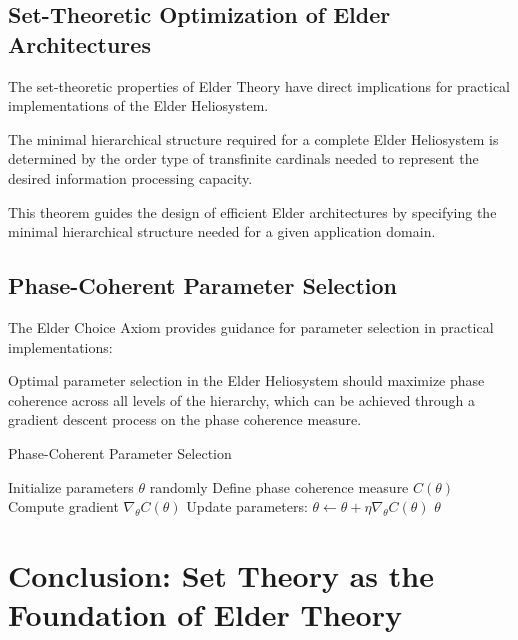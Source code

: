 \subsection{Set-Theoretic Optimization of Elder Architectures}

The set-theoretic properties of Elder Theory have direct implications for practical implementations of the Elder Heliosystem.

\begin{theorem}
The minimal hierarchical structure required for a complete Elder Heliosystem is determined by the order type of transfinite cardinals needed to represent the desired information processing capacity.
\end{theorem}

This theorem guides the design of efficient Elder architectures by specifying the minimal hierarchical structure needed for a given application domain.

\subsection{Phase-Coherent Parameter Selection}

The Elder Choice Axiom provides guidance for parameter selection in practical implementations:

\begin{proposition}
Optimal parameter selection in the Elder Heliosystem should maximize phase coherence across all levels of the hierarchy, which can be achieved through a gradient descent process on the phase coherence measure.
\end{proposition}

\begin{algorithm}[h]
\caption{Phase-Coherent Parameter Selection}
\begin{algorithmic}[1]
\State Initialize parameters $\theta$ randomly
\State Define phase coherence measure $C(\theta)$
\State Compute gradient $\nabla_{\theta} C(\theta)$
\State Update parameters: $\theta \leftarrow \theta + \eta \nabla_{\theta} C(\theta)$
\EndWhile
\State \Return $\theta$
\end{algorithmic}
\end{algorithm}

\section{Conclusion: Set Theory as the Foundation of Elder Theory}


